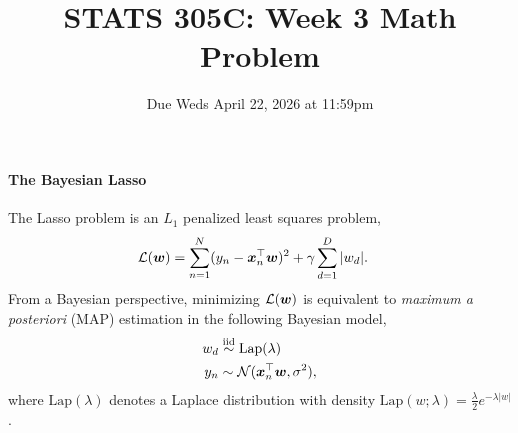 \documentclass[11pt]{article}
\title{STATS 305C: Week 3 Math Problem}
\date{Due Weds April 22, 2026 at 11:59pm}
\begin{document}
\maketitle
\noindent

\paragraph{The Bayesian Lasso}
The Lasso problem is an $L_1$ penalized least squares problem,
\begin{align}
    \mathcal{L}(\boldsymbol{w}) &= \sum_{n=1}^N (y_n - \boldsymbol{x}_n^\top \boldsymbol{w})^2 + \gamma \sum_{d=1}^D |w_d|.
    \label{eq:lasso}
\end{align}
From a Bayesian perspective, minimizing $\mathcal{L}(\boldsymbol{w})$ is equivalent to \textit{maximum a posteriori} (MAP) estimation in the following Bayesian model,
\begin{equation}
\label{eq:bayes_lasso}
\begin{aligned}
    w_d &\stackrel{\text{iid}}{\sim} \mathrm{Lap}(\lambda) \\
    y_n &\sim \mathcal{N}(\boldsymbol{x}_n^\top \boldsymbol{w}, \sigma^2),
\end{aligned}
\end{equation}
where $\mathrm{Lap}(\lambda)$ denotes a Laplace distribution with density $\mathrm{Lap}(w; \lambda) = \tfrac{\lambda}{2} e^{-\lambda |w|}$.
\end{document}
